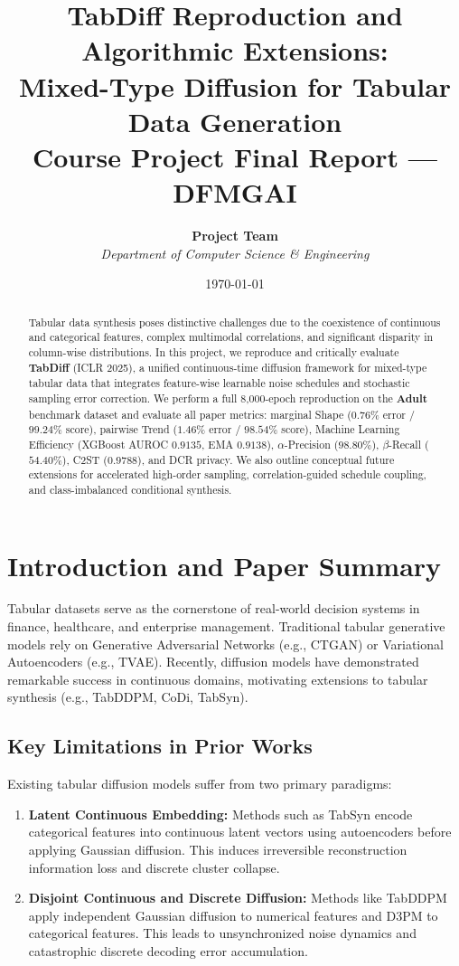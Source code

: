 \documentclass[11pt,a4paper]{article}
\title{\textbf{TabDiff Reproduction and Algorithmic Extensions:\\Mixed-Type Diffusion for Tabular Data Generation}\\[0.3em]
\large Course Project Final Report --- DFMGAI}
\author{\textbf{Project Team}\\\textit{Department of Computer Science \& Engineering}}
\date{\today}
\begin{document}
\maketitle

\begin{abstract}
Tabular data synthesis poses distinctive challenges due to the coexistence of continuous and categorical features, complex multimodal correlations, and significant disparity in column-wise distributions. In this project, we reproduce and critically evaluate \textbf{TabDiff} (ICLR 2025), a unified continuous-time diffusion framework for mixed-type tabular data that integrates feature-wise learnable noise schedules and stochastic sampling error correction. We perform a full 8,000-epoch reproduction on the \textbf{Adult} benchmark dataset and evaluate all paper metrics: marginal Shape ($0.76\%$ error / $99.24\%$ score), pairwise Trend ($1.46\%$ error / $98.54\%$ score), Machine Learning Efficiency (XGBoost AUROC $0.9135$, EMA $0.9138$), $\alpha$-Precision ($98.80\%$), $\beta$-Recall ($54.40\%$), C2ST ($0.9788$), and DCR privacy. We also outline conceptual future extensions for accelerated high-order sampling, correlation-guided schedule coupling, and class-imbalanced conditional synthesis.
\end{abstract}

\section{Introduction and Paper Summary}
Tabular datasets serve as the cornerstone of real-world decision systems in finance, healthcare, and enterprise management. Traditional tabular generative models rely on Generative Adversarial Networks (e.g., CTGAN) or Variational Autoencoders (e.g., TVAE). Recently, diffusion models have demonstrated remarkable success in continuous domains, motivating extensions to tabular synthesis (e.g., TabDDPM, CoDi, TabSyn).

\subsection{Key Limitations in Prior Works}
Existing tabular diffusion models suffer from two primary paradigms:
\begin{enumerate}
    \item \textbf{Latent Continuous Embedding:} Methods such as TabSyn encode categorical features into continuous latent vectors using autoencoders before applying Gaussian diffusion. This induces irreversible reconstruction information loss and discrete cluster collapse.
    \item \textbf{Disjoint Continuous and Discrete Diffusion:} Methods like TabDDPM apply independent Gaussian diffusion to numerical features and D3PM to categorical features. This leads to unsynchronized noise dynamics and catastrophic discrete decoding error accumulation.
\end{enumerate}
\end{document}
